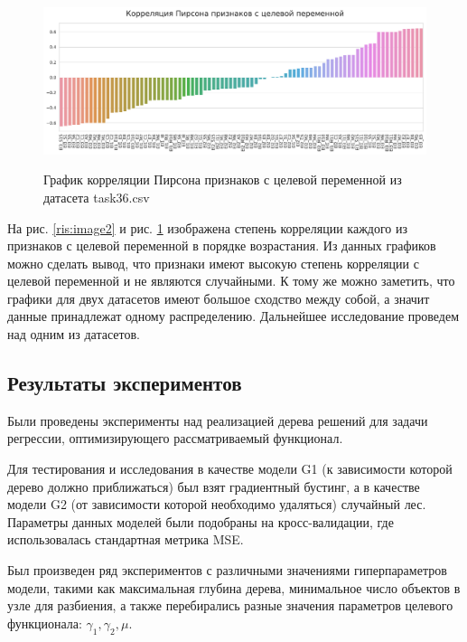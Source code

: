 \documentclass{article}
\begin{document}
\begin{figure}[h]
	\centering
	
	\begin{minipage}[h]{\linewidth}
		{\includegraphics[width=1.0\linewidth]{../figures/corr_task36.pdf}}	
	\end{minipage}
	
	
	\caption{График корреляции Пирсона признаков с целевой переменной из датасета task36.csv }
	\label{ris:image3}
\end{figure}

На рис. \ref{ris:image2} и рис. \ref{ris:image3} изображена степень корреляции каждого из признаков с целевой переменной в порядке возрастания. Из данных графиков можно сделать вывод, что признаки имеют высокую степень корреляции с целевой переменной и не являются случайными. К тому же можно заметить, что графики для двух датасетов имеют большое сходство между собой, а значит данные принадлежат одному распределению. Дальнейшее исследование проведем над одним из датасетов.



\subsection{Результаты экспериментов}

Были проведены эксперименты над реализацией дерева решений для задачи регрессии, оптимизирующего рассматриваемый функционал.

Для тестирования и исследования в качестве модели G1 (к зависимости которой дерево должно приближаться) был взят градиентный бустинг, а в качестве модели G2 (от зависимости которой необходимо удаляться) случайный лес. Параметры данных моделей были подобраны на кросс-валидации, где использовалась стандартная метрика MSE.

Был произведен ряд экспериментов с различными значениями гиперпараметров модели, такими как максимальная глубина дерева, минимальное число объектов в узле для разбиения, а также перебирались разные значения параметров целевого функционала: $\gamma_1, \gamma_2, \mu$.
\end{document}
